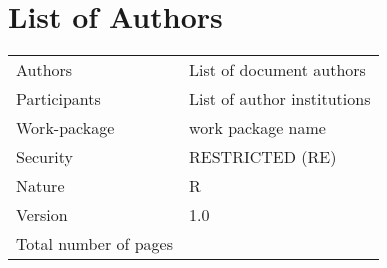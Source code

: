 
\chapter*{List of Authors}

{
  \footnotesize
    \centering
    \begin{tabular}{|l|p{}|}
      \hline
      Authors & List of document authors  \\ 
      Participants &   List of author institutions  \\
      Work-package & work package name\\
      Security & RESTRICTED (RE)\\
      Nature & R \\
      Version &  1.0 \\
      Total number of pages & \pageref{LastPage} \\
      \hline
    \end{tabular}
}  

